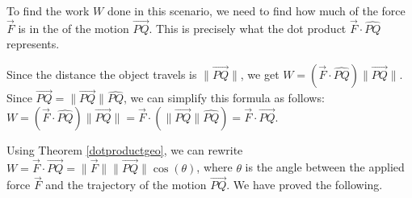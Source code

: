 \documentclass{ximera}
\begin{document}
\begin{center}
\end{center}

To find the work $W$ done in this scenario, we need to find how much of the force $\overrightarrow{F}$ is  in the  of the motion $\overrightarrow{PQ}$.  This is precisely what the dot product $\overrightarrow{F} \cdot \widehat{PQ}$ represents.  

 

Since the distance the object travels is $\| \overrightarrow{PQ} \|$, we get $W = (\overrightarrow{F} \cdot \widehat{PQ}) \| \overrightarrow{PQ} \|$.  Since $\overrightarrow{PQ} = \|\overrightarrow{PQ}\| \widehat{PQ}$, we can simplify this formula as follows:   $W = (\overrightarrow{F} \cdot \widehat{PQ}) \| \overrightarrow{PQ} \| = \overrightarrow{F} \cdot ( \| \overrightarrow{PQ} \|\widehat{PQ} ) = \overrightarrow{F} \cdot \overrightarrow{PQ}$.

 

Using Theorem \ref{dotproductgeo}, we can rewrite  $W = \overrightarrow{F} \cdot \overrightarrow{PQ} =  \| \overrightarrow{F} \| \| \overrightarrow{PQ} \| \cos(\theta)$, where $\theta$ is the angle between the applied force $\overrightarrow{F}$ and the trajectory of the motion $\overrightarrow{PQ}$.  We have proved the following.

 
\end{document}

